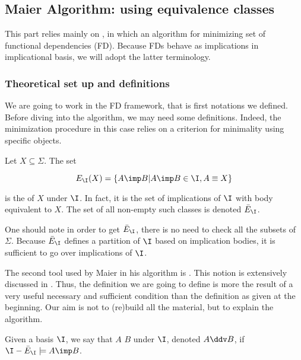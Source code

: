 \subsection{Maier Algorithm: using equivalence classes}


This part relies mainly on \cite{david_minimum_1980}, \cite{maier_theory_1983} 
in which an algorithm for minimizing set of functional dependencies (FD). 
Because FDs behave as implications in implicational basis, we will adopt the 
latter terminology.

\subsubsection{Theoretical set up and definitions}

We are going to work in the FD framework, that is first notations we defined. 
Before diving into the algorithm, we may need some definitions. Indeed, the 
minimization procedure in this case relies on a criterion for minimality using
specific objects. 

\begin{definition} Let $X \subseteq \Sigma$. The set
	
	\[ E_{\I}(X) = \{ A \imp B | A \imp B \in \I, A \equiv X \} \]
	
\noindent is the  of $X$ under $\I$. In fact, it 
is the set of implications of $\I$ with body equivalent to $X$. The set of all 
non-empty such classes is denoted $\bar{E}_{\I}$.
	
\end{definition}

One should note in order to get $\bar{E}_{\I}$, there is no need to check all
the subsets of $\Sigma$. Because $\bar{E}_{\I}$ defines a partition of $\I$ 
based on implication bodies, it is sufficient to go over implications of $\I$.

\vspace{1.2em}

The second tool used by Maier in his algorithm is .
This notion is extensively discussed in \cite{david_minimum_1980, 
maier_theory_1983}. Thus, the definition we are going to define is more the 
result of a very useful necessary and sufficient condition than the definition
as given at the beginning. Our aim is not to (re)build all the material, but to 
explain the algorithm.

\begin{definition} Given a basis $\I$, we say that
$A$  $B$ under $\I$, denoted $A \ddv B$, if $\I -
\bar{E}_{\I} \models A \imp B$. 
	
\end{definition}

